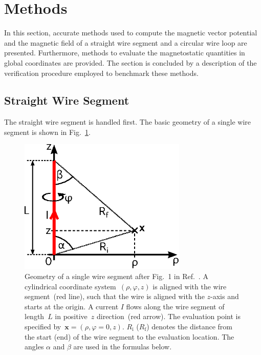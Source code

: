 \section{Methods}
\label{sec:methods}
In this section, accurate methods used to compute the magnetic vector potential and the magnetic field
of a straight wire segment and a circular wire loop are presented.
Furthermore, methods to evaluate the magnetostatic quantities in global coordinates are provided.
The section is concluded by a description of the verification procedure
employed to benchmark these methods.

\subsection{Straight Wire Segment}
The straight wire segment is handled first.
The basic geometry of a single wire segment is shown in Fig.~\ref{fig:straightWireSegment}.
\begin{figure}[htbp]
 \centering
 \includegraphics[width=8cm]{img/straightWireSegment.eps}
 \caption{Geometry of a single wire segment after Fig.~1 in Ref.~\cite{hanson_hirshman_2002}.
          A cylindrical coordinate system~$(\rho, \varphi,z)$ is aligned with the wire segment~(red line),
          such that the wire is aligned with the $z$-axis and starts at the origin.
          A current $I$ flows along the wire segment of length~$L$ in positive~$z$ direction~(red arrow).
          The evaluation point is specified by~$\mathbf{x} = (\rho, \varphi=0, z)$.
          $R_\mathrm{i}$ ($R_\mathrm{f}$) denotes the distance from the start (end) of the wire segment to the evaluation location.
          The angles $\alpha$ and $\beta$ are used in the formulas below.}
 \label{fig:straightWireSegment}
\end{figure}

